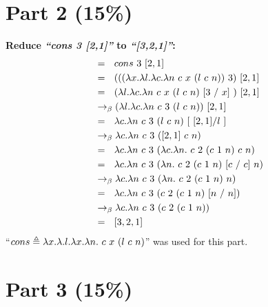 \documentclass{article}
\begin{document}
	
		
	\section{Part 2 (15\%)}
	
	\begin{Large}
		\textbf{Reduce \textit{``cons 3 [2,1]''} to \textit{``[3,2,1]''}:}
		\begin{align*}
			&= \saq cons \ 3 \ [2,1]  \\
			&= \saq (((\la x.\la l.\la c.\la n \ c \ x \ (l \ c \ n))\ 3) \ [2,1] \\
			&= \saq (\la l.\la c.\la n \ c \ x \ (l \ c \ n) \ [3 \ / \ x] \ ) \ [2,1] \\
			&\equals (\la l.\la c.\la n \ c \ 3 \ (l \ c \ n)) \ [2,1] \\
			&= \saq \la c.\la n \ c \ 3 \ (l \ c \ n) \ [ \ [2,1] / l \ ] \\
			&\equals \la c.\la n \ c \ 3 \ ([2,1] \ c \ n) \\
			&= \saq \la c.\la n \ c \ 3 \ (\la c.\la n. \ c \ 2 \ (c \ 1 \ n) \ c \ n) \\
			&= \saq \la c.\la n \ c \ 3 \ (\la n. \ c \ 2 \ (c \ 1 \ n) \ [c \ / \ c] \ n) \\
			&\equals \la c.\la n \ c \ 3 \ (\la n. \ c \ 2 \ (c \ 1 \ n) \ n) \\
			&= \saq \la c.\la n \ c \ 3 \ ( c \ 2 \ (c \ 1 \ n) \ [n \ / \ n]) \\
			&\equals \la c.\la n \ c \ 3 \ ( c \ 2 \ (c \ 1 \ n)) \\
			&= \saq [3,2,1]
		\end{align*}
		``$cons \triangleq \lambda x.\lambda .l.\lambda x.\lambda n. \ c \ x \ (l \ c \ n)$'' was used for this part.
	\end{Large}
	\newpage
	
	
	
	\section{Part 3 (15\%)}
\end{document}
